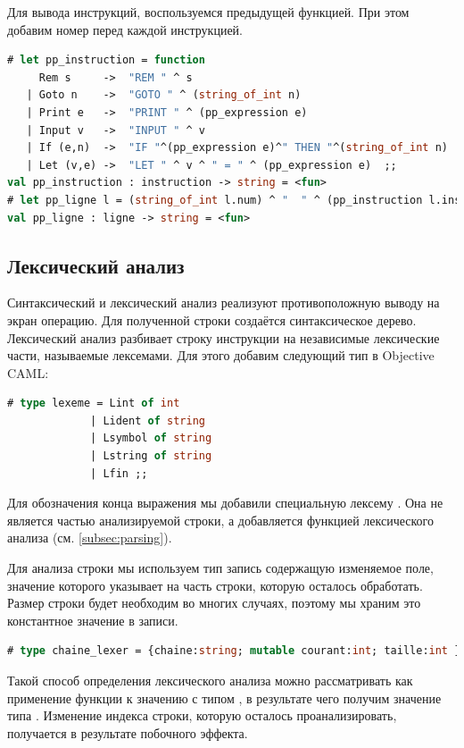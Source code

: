 Для вывода инструкций, воспользуемся предыдущей функцией. При этом добавим номер 
перед каждой инструкцией.

\begin{lstlisting}[language=OCaml]
# let pp_instruction = function 
     Rem s     ->  "REM " ^ s
   | Goto n    ->  "GOTO " ^ (string_of_int n)
   | Print e   ->  "PRINT " ^ (pp_expression e)
   | Input v   ->  "INPUT " ^ v
   | If (e,n)  ->  "IF "^(pp_expression e)^" THEN "^(string_of_int n)
   | Let (v,e) ->  "LET " ^ v ^ " = " ^ (pp_expression e)  ;;
val pp_instruction : instruction -> string = <fun>
# let pp_ligne l = (string_of_int l.num) ^ "  " ^ (pp_instruction l.inst)  ;;
val pp_ligne : ligne -> string = <fun>
\end{lstlisting}

\subsection{Лексический анализ}
\label{subsec:Lexing}

Синтаксический и лексический анализ реализуют противоположную выводу на экран 
операцию. Для полученной строки создаётся синтаксическое дерево. Лексический 
анализ разбивает строку инструкции на независимые лексические части, называемые 
лексемами. Для этого добавим следующий тип в Objective CAML:

\begin{lstlisting}[language=OCaml]
# type lexeme = Lint of int 
             | Lident of string 
             | Lsymbol of string  
             | Lstring of string
             | Lfin ;;
\end{lstlisting}

Для обозначения конца выражения мы добавили специальную лексему . 
Она не является частью анализируемой строки, а добавляется функцией 
лексического анализа (см. \ref{subsec:parsing}).

Для анализа строки мы используем тип запись содержащую изменяемое поле, значение 
которого указывает на часть строки, которую осталось обработать. Размер строки 
будет необходим во многих случаях, поэтому мы храним это константное значение в 
записи.

\begin{lstlisting}[language=OCaml]
# type chaine_lexer = {chaine:string; mutable courant:int; taille:int } ;;
\end{lstlisting}

Такой способ определения лексического анализа можно рассматривать как применение 
функции к значению с типом , в результате чего получим 
значение типа . Изменение индекса строки, которую осталось 
проанализировать, получается в результате побочного эффекта.

